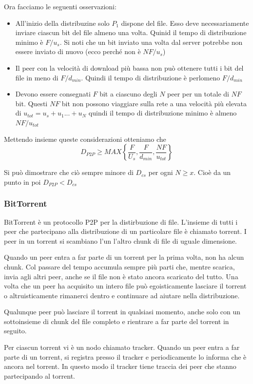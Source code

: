 \documentclass{book}
\begin{document}
Ora facciamo le seguenti osservazioni:
\begin{itemize}
	\item All'inizio della distribuzine solo $P_{1}$ dispone del file. Esso deve necessariamente inviare ciascun bit del file almeno una volta. Quinid il tempo di distribuzione minimo è $F/u_{s}$. Si noti che un bit inviato una volta dal server potrebbe non essere inviato di nuovo (ecco perché non è $NF/u_{s}$)
	\item Il peer con la velocità di download più bassa non può ottenere tutti i bit del file in meno di $F/d_{min}$. Quindi il tempo di distribuzione è perlomeno $F/d_{min}$
	\item Devono essere consegnati $F$ bit a ciascuno degli $N$ peer per un totale di $NF$ bit. Questi $NF$ bit non possono viaggiare sulla rete a una velocità più elevata di $u_{tot} = u_{s} + u_1 ... + u_{N}$ quindi il tempo di distribuzione minimo è almeno $NF/u_{tot}$
\end{itemize}

Mettendo insieme queste considerazioni otteniamo che
$$  D_{P2P} \geq MAX\left\{ \frac{F}{U_s}, \frac{F}{d_{min}}, \frac{NF}{u_{tot}} \right\}$$

Si può dimostrare che ciò sempre minore di $D_{cs}$ per ogni $N \geq x$. Cioè da un punto in poi $D_{P2P} < D_{cs}$

\subsubsection*{BitTorrent}
BitTorrent è un protocollo P2P per la distirbuzione di file. L'insieme di tutti i peer che partecipano alla distribuzione di un particolare file è chiamato torrent. I peer in un torrent si scambiano l'un l'altro chunk di file di uguale dimensione.

Quando un peer entra a far parte di un torrent per la prima volta, non ha alcun chunk. Col passare del tempo accumula sempre più parti che, mentre scarica, invia agli altri peer, anche se il file non è stato ancora scaricato del tutto. Una volta che un peer ha acquisito un intero file può egoisticamente lasciare il torrent o altruisticamente rimanerci dentro e continuare ad aiutare nella distribuzione.

Qualunque peer può lasciare il torrent in qualsiasi momento, anche solo con un sottoinsieme di chunk del file completo e rientrare a far parte del torrent in seguito.

Per ciascun torrent vi è un nodo chiamato tracker. Quando un peer entra a far parte di un torrent, si registra presso il tracker e periodicamente lo informa che è ancora nel torrent. In questo modo il tracker tiene traccia dei peer che stanno partecipando al torrent.
\end{document}
